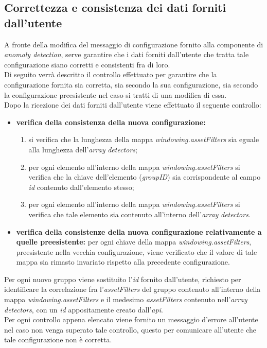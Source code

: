 \subsection{Correttezza e consistenza dei dati forniti dall'utente}
A fronte della modifica del messaggio di configurazione fornito alla componente di \textit{anomaly detection}, serve garantire che i dati forniti dall'utente che tratta tale configurazione siano corretti e consistenti fra di loro.\\
Di seguito verrà descritto il controllo effettuato per garantire che la configurazione fornita sia corretta, sia secondo la sua configurazione, sia secondo la configurazione preesistente nel caso si tratti di una modifica di essa.\\
Dopo la ricezione dei dati forniti dall'utente viene effettuato il seguente controllo:
\begin{itemize}
	\item{\textbf{verifica della consistenza della nuova configurazione:}
		\begin{enumerate}
			\item{si verifica che la lunghezza della mappa \textit{windowing.assetFilters} sia eguale alla lunghezza dell'\textit{array} \textit{detectors};}
			\item{per ogni elemento all'interno della mappa \textit{windowing.assetFilters} si verifica che la chiave dell'elemento (\textit{groupID}) sia corrispondente al campo \textit{id} contenuto dall'elemento stesso;}
			\item{per ogni elemento all'interno della mappa \textit{windowing.assetFilters} si verifica che tale elemento sia contenuto all'interno dell'\textit{array} \textit{detectors}.}
		\end{enumerate}}
	\item{\textbf{verifica della consistenze della nuova configurazione relativamente a quelle preesistente:} per ogni chiave della mappa \textit{windowing.assetFilters}, preesistente nella vecchia configurazione, viene verificato che il valore di tale mappa sia rimasto invariato rispetto alla precedente configurazione.}
\end{itemize}

Per ogni nuovo gruppo viene sostituito l'\textit{id} fornito dall'utente, richiesto per identificare la correlazione fra l'\textit{assetFilters} del gruppo contenuto all'interno della mappa \textit{windowing.assetFilters} e il medesimo \textit{assetFilters} contenuto nell'\textit{array} \textit{detectors}, con un \textit{id} appositamente creato dall'\textit{\gls{api}}.\\
Per ogni controllo appena elencato viene fornito un messaggio d'errore all'utente nel caso non venga superato tale controllo, questo per comunicare all'utente che tale configurazione non è corretta.


